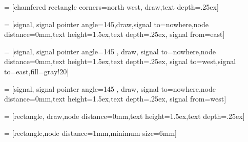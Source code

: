 %
\usepackage{ifthen}

\usepackage{tikz}
\usetikzlibrary{shapes,shadows,chains,shapes.multipart,arrows,positioning,fit}


 = [chamfered rectangle corners=north west, draw,text depth=.25ex]

 = [signal, signal pointer angle=145,draw,signal to=nowhere,node
distance=0mm,text height=1.5ex,text depth=.25ex, signal from=east]

 = [signal, signal pointer angle=145 , draw, signal to=nowhere,node distance=0mm,text height=1.5ex,text depth=.25ex, signal to=west,signal to=east,fill=gray!20]

 = [signal, signal pointer angle=145 , draw, signal to=nowhere,node distance=0mm,text height=1.5ex,text depth=.25ex, signal from=west]

 = [rectangle, draw,node distance=0mm,text height=1.5ex,text depth=.25ex]

 = [rectangle,node distance=1mm,minimum size=6mm]

\begin{comment}
\begin{tikzpicture}
\node[lhs] (n0) {left hand side};
\node[tgt] (n1) [right=of n0] {target};
\node[rhs] (n2) [right=of n1] {foo};
\node[cls] (n3) [right=of n2] {bar};
\node[dist] (txt) [right=of n3] {\dist{the}{10}\dist{a}{9}\dist{in}{8}\dsum{1}{1}};
\end{tikzpicture}
\end{comment}



\newcommand{\wlr}[7]{\noindent\ensuremath{\begin{tikzpicture}
\ifthenelse{\equal{#1}{w}}{
  \node (sp) [draw,fill=white,circle,inner sep=0pt,minimum size=0pt] {};
}{
  \node (sp) [draw=white,fill=white,circle,inner sep=0pt,minimum size=1.5pt] {};
}
\node[lhs] (n0) [right=of sp] {{\sf #3}};
\ifthenelse{\equal{#1}{w}}{
  \node (c1) at (n0.north west) [draw,fill,circle,inner sep=0pt,minimum size=3pt] {};
}{}
\node[tgt] (n1) [right=of n0] {{\sf #4}};
\ifthenelse{\equal{#5}{}}{
  \node[cls] (n3) [right=of n1] {{\sf #6}};
}{ %
  \node[rhs] (n2) [right=of n1] {{\sf #5}};
  \node[cls] (n3) [right=of n2] {{\sf #6}};
} %
\ifthenelse{\equal{#2}{ic}}{
  \draw (n3.north east) -- (n3.south west);
}{}
\ifthenelse{\equal{#2}{cd}}{
  \draw [dotted, thick] (n3.north east) -- (n3.south west);
}{}
\node[dist] (txt) [right=of n3] {#7};
\end{tikzpicture}}}


